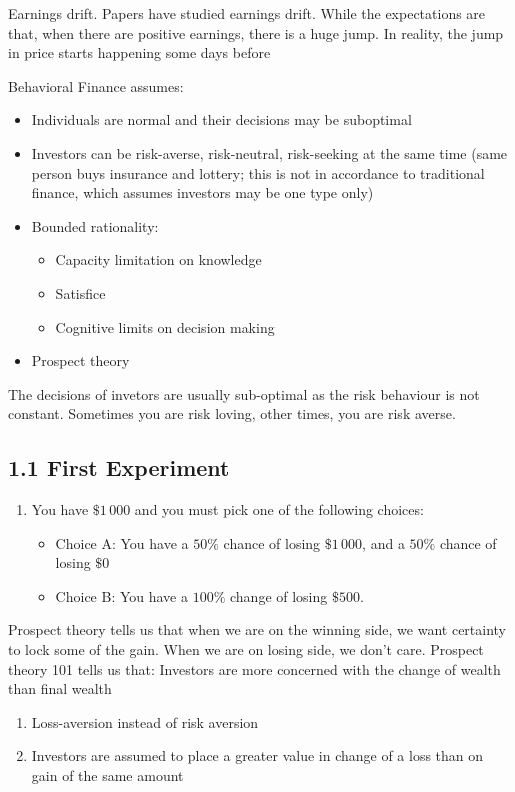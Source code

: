 \documentclass[0pt, a4paper]{article}
\begin{document}
Earnings drift. Papers have studied earnings drift. While the expectations are that, when there are positive earnings, there is a huge jump. In reality, the jump in price starts happening some days before

Behavioral Finance assumes:
\begin{itemize}
	\item Individuals are normal and their decisions may be suboptimal
	\item Investors can be risk-averse, risk-neutral, risk-seeking at the same time (same person buys insurance and lottery; this is not in accordance to traditional finance, which assumes investors may be one type only)
	\item Bounded rationality:
	\begin{itemize}
		\item Capacity limitation on knowledge
		\item Satisfice
		\item Cognitive limits on decision making
	\end{itemize}
	\item Prospect theory
\end{itemize}

The decisions of invetors are usually sub-optimal as the risk behaviour is not constant. Sometimes you are risk loving, other times, you are risk averse.

\subsection*{1.1 First Experiment}

\begin{enumerate}
	\item You have $\$ 1\,000$ and you must pick one of the following choices:
	\begin{itemize}:
		\item Choice A: You have a $50\%$ chance of losing $\$ 1\,000$, and a $50\%$ chance of losing $\$0$
		\item Choice B: You have a $100\%$ change of losing $\$500$.
	\end{itemize}
\end{enumerate}

Prospect theory tells us that when we are on the winning side, we want certainty to lock some of the gain. When we are on losing side, we don't care. Prospect theory 101 tells us that:
Investors are more concerned with the change of wealth than final wealth 
\begin{enumerate}
	\item Loss-aversion instead of risk aversion
	\item Investors are assumed to place a greater value in change of a loss than on gain of the same amount\
\end{enumerate}
\end{document}
